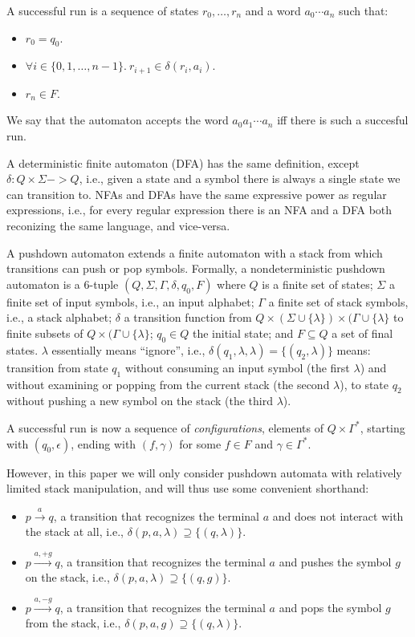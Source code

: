 \documentclass[runningheads]{llncs}
\newcommand{\T}{\Sigma} %
\begin{document}
A successful run is a sequence of states $r_0, \ldots, r_n$ and a word $a_0\cdots a_n$ such that:

\begin{itemize}
\item $r_0 = q_0$.
\item $\forall i \in \{0, 1, \ldots, n-1\}.\ r_{i+1} \in \delta(r_i, a_i)$.
\item $r_n \in F$.
\end{itemize}

\noindent We say that the automaton accepts the word $a_0a_1\cdots a_n$ iff there is such a succesful run.

A deterministic finite automaton (DFA) has the same definition, except $\delta : Q \times \Sigma -> Q$, i.e., given a state and a symbol there is always a single state we can transition to. NFAs and DFAs have the same expressive power as regular expressions, i.e., for every regular expression there is an NFA and a DFA both reconizing the same language, and vice-versa. %

A pushdown automaton extends a finite automaton with a stack from which transitions can push or pop symbols. Formally, a nondeterministic pushdown automaton is a 6-tuple $(Q, \T, \Gamma, \delta, q_0, F)$ where $Q$ is a finite set of states; $\T$ a finite set of input symbols, i.e., an input alphabet; $\Gamma$ a finite set of stack symbols, i.e., a stack alphabet; $\delta$ a transition function from $Q \times (\T \cup \{\lambda\}) \times (\Gamma \cup \{\lambda\}$ to finite subsets of $Q \times (\Gamma \cup \{\lambda\}$; $q_0 \in Q$ the initial state; and $F \subseteq Q$ a set of final states. $\lambda$ essentially means ``ignore'', i.e., $\delta(q_1, \lambda, \lambda) = \{(q_2, \lambda)\}$ means: transition from state $q_1$ without consuming an input symbol (the first $\lambda$) and without examining or popping from the current stack (the second $\lambda$), to state $q_2$ without pushing a new symbol on the stack (the third $\lambda$).

A successful run is now a sequence of \emph{configurations}, elements of $Q \times \Gamma^{*}$, starting with $(q_0, \epsilon)$, ending with $(f, \gamma)$ for some $f \in F$ and $\gamma \in \Gamma^{*}$.

However, in this paper we will only consider pushdown automata with relatively limited stack manipulation, and will thus use some convenient shorthand:

\begin{itemize}
\item $p \xrightarrow{a} q$, a transition that recognizes the terminal $a$ and does not interact with the stack at all, i.e., $\delta(p, a, \lambda) \supseteq \{(q, \lambda)\}$.
\item $p \xrightarrow{a, +g} q$, a transition that recognizes the terminal $a$ and pushes the symbol $g$ on the stack, i.e., $\delta(p, a, \lambda) \supseteq \{(q, g)\}$.
\item $p \xrightarrow{a, -g} q$, a transition that recognizes the terminal $a$ and pops the symbol $g$ from the stack, i.e., $\delta(p, a, g) \supseteq \{(q, \lambda)\}$.
\end{itemize}
\end{document}
